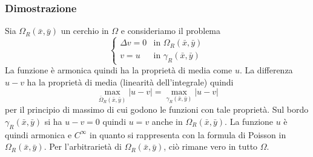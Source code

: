 \subsubsection{Dimostrazione}
Sia $\Omega_R(\bar{x}, \bar{y})$ un cerchio in $\Omega$ e consideriamo il
problema
\[
	\left\{
	\begin{array}{ll}
		\Delta v=0 	& \text{in } \Omega_R(\bar{x}, \bar{y}) \\
		v=u		& \text{in } \gamma_R(\bar{x}, \bar{y})
	\end{array}
	\right.
\]
La funzione \`e armonica quindi ha la propriet\`a di media come $u$.
La differenza $u-v$ ha la propriet\`a di media (linearit\`a dell'integrale)
quindi
\[
	\max_{\bar{\Omega}_R(\bar{x}, \bar{y})} |u-v|=
	\max_{{\gamma}_R(\bar{x}, \bar{y})} |u-v|
\]
per il principio di massimo di cui godono le funzioni con tale propriet\`a.
Sul bordo ${\gamma}_R(\bar{x}, \bar{y})$ si ha $u-v=0$ quindi $u=v$ anche in
$\Omega_R(\bar{x}, \bar{y})$.
La funzione $u$ \`e quindi armonica e $C^{\infty}$ in quanto si rappresenta
con la formula di Poisson in $\Omega_R(\bar{x}, \bar{y})$.
Per l'arbitrariet\`a di $\Omega_R(\bar{x}, \bar{y})$, ci\`o rimane vero in
tutto $\Omega$.
